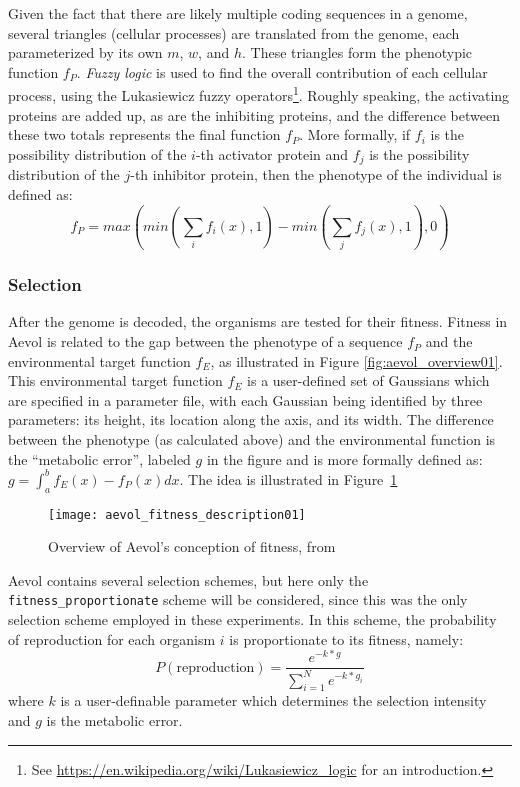 Given the fact that there are likely multiple coding sequences in a genome, several triangles (cellular processes) are translated from the genome, each parameterized by its own $m$, $w$, and $h$. These triangles form the phenotypic function $f_P$. \textit{Fuzzy logic} is used to find the overall contribution of each cellular process, using the Lukasiewicz fuzzy operators\footnote{See \url{https://en.wikipedia.org/wiki/Lukasiewicz\_logic} for an introduction.}. Roughly speaking, the activating proteins are added up, as are the inhibiting proteins, and the difference between these two totals represents the final function $f_P$. More formally, if $f_i$ is the possibility distribution of the $i$-th activator protein and $f_j$ is the possibility distribution of the $j$-th inhibitor protein, then the phenotype of the individual is defined as:
\begin{equation*}
f_P = max\left(min\left(\sum_{i}^{}f_i(x),1 \right) - min\left(\sum_{j}^{}f_j(x),1 \right) ,0\right)
\end{equation*}

\subsubsection{Selection}\label{subsec:aevol_selection}
After the genome is decoded, the organisms are tested for their fitness. Fitness in Aevol is related to the gap between the phenotype of a sequence $f_P$ and the environmental  target function $f_E$, as illustrated in Figure \ref{fig:aevol_overview01}. This environmental target function $f_E$ is a user-defined set of Gaussians which are specified in a parameter file, with each Gaussian being identified by three parameters: its height, its location along the axis, and its width. The difference between the phenotype (as calculated above) and the environmental function is the ``metabolic error'', labeled $g$ in the figure and is more formally defined as:  $g = \int_{a}^{b} f_E(x) - f_P(x) dx$. The idea is illustrated in Figure~\ref{fig:aevol_fitness01}

\begin{figure}[H]
	\texttt{[image: aevol\_fitness\_description01]}
	\centering
	\caption[Overview of Aevol's concept of fitness.]{Overview of Aevol's conception of fitness, from \cite{knibbe:tel-00482375}}
	\label{fig:aevol_fitness01}
\end{figure}

Aevol contains several selection schemes, but here only the \texttt{fitness\_proportionate} scheme will be considered, since this was the only selection scheme employed in these experiments. In this scheme, the probability of reproduction for each organism $i$ is proportionate to its fitness, namely:
\begin{equation*}
P(\text{reproduction}) = \frac{e^{-k * g}}{\sum_{i=1}^{N} e^{-k * g_i}}
\end{equation*} 
where $k$ is a user-definable parameter which determines the selection intensity and $g$ is the metabolic error.
